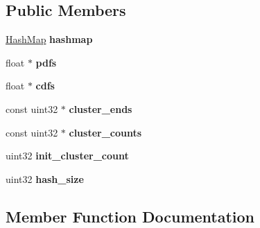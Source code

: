 \subsection*{Public Members}
\begin{DoxyCompactItemize}
\item 
\mbox{\label{struct_adaptive_clustered_r_l_view_a349f6f91af8136c145d2dab399b392bb}} 
\hyperlink{structcugar_1_1cuda_1_1_sync_free_hash_map}{Hash\+Map} {\bfseries hashmap}
\item 
\mbox{\label{struct_adaptive_clustered_r_l_view_a92f12ae4a1ba91f7854a324ebcce39b9}} 
float $\ast$ {\bfseries pdfs}
\item 
\mbox{\label{struct_adaptive_clustered_r_l_view_a152e5b789f35e32096b146b8b5e89cdb}} 
float $\ast$ {\bfseries cdfs}
\item 
\mbox{\label{struct_adaptive_clustered_r_l_view_a9dcf1c20b0938a897f3bbb74fb142486}} 
const uint32 $\ast$ {\bfseries cluster\+\_\+ends}
\item 
\mbox{\label{struct_adaptive_clustered_r_l_view_a0df45611c781cd49d2fe5b29ddfac968}} 
const uint32 $\ast$ {\bfseries cluster\+\_\+counts}
\item 
\mbox{\label{struct_adaptive_clustered_r_l_view_a5c677eeded930ecebeee162d152cd3a2}} 
uint32 {\bfseries init\+\_\+cluster\+\_\+count}
\item 
\mbox{\label{struct_adaptive_clustered_r_l_view_a5e59820a28da8e4294f8217f46d6427e}} 
uint32 {\bfseries hash\+\_\+size}
\end{DoxyCompactItemize}


\subsection{Member Function Documentation}
\mbox{\label{struct_adaptive_clustered_r_l_view_af716fb3b65bc1c3ffb25bd7055feb41b}} 

